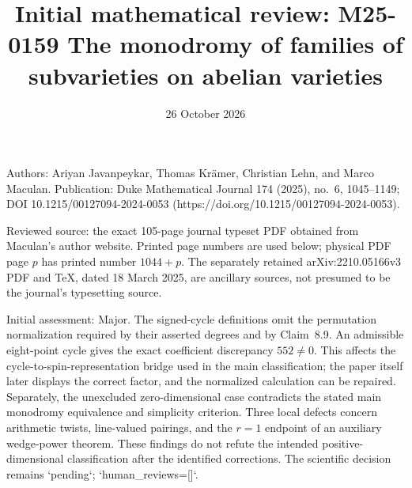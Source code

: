 \documentclass[10pt]{article}
\title{Initial mathematical review: M25-0159
The monodromy of families of subvarieties on abelian varieties}
\author{}
\date{26 October 2026}
\begin{document}
\maketitle
Authors: Ariyan Javanpeykar, Thomas Krämer, Christian Lehn, and Marco Maculan. Publication: Duke Mathematical Journal 174 (2025), no. 6, 1045–1149; DOI 10.1215/00127094-2024-0053 (https://doi.org/10.1215/00127094-2024-0053).\par
Reviewed source: the exact 105-page journal typeset PDF obtained from Maculan’s author website. Printed page numbers are used below; physical PDF page \(p\) has printed number \(1044+p\). The separately retained arXiv:2210.05166v3 PDF and TeX, dated 18 March 2025, are ancillary sources, not presumed to be the journal’s typesetting source.\par
Initial assessment: Major. The signed-cycle definitions omit the permutation normalization required by their asserted degrees and by Claim 8.9. An admissible eight-point cycle gives the exact coefficient discrepancy \(552\ne0\). This affects the cycle-to-spin-representation bridge used in the main classification; the paper itself later displays the correct factor, and the normalized calculation can be repaired. Separately, the unexcluded zero-dimensional case contradicts the stated main monodromy equivalence and simplicity criterion. Three local defects concern arithmetic twists, line-valued pairings, and the \(r=1\) endpoint of an auxiliary wedge-power theorem. These findings do not refute the intended positive-dimensional classification after the identified corrections. The scientific decision remains `pending`; `human\_reviews=[]`.\par
\end{document}
